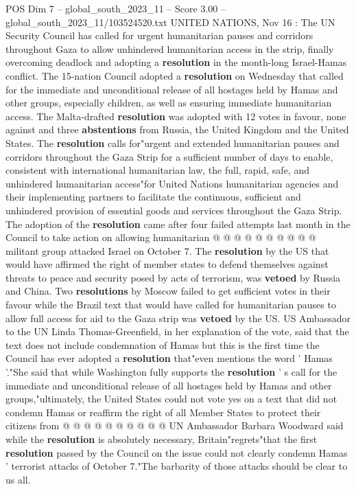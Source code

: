 \begin{textsample}{POS Dim 7 – global\_south\_2023\_11 – Score 3.00 – global\_south\_2023\_11/103524520.txt}  \label{ex:f7_pos_123}
UNITED NATIONS, Nov 16 : The UN Security Council has called for urgent humanitarian pauses and corridors throughout Gaza to allow unhindered humanitarian access in the strip, finally overcoming deadlock and adopting a \textbf{resolution} in the month-long Israel-Hamas conflict.
The 15-nation Council adopted a \textbf{resolution} on Wednesday that called for the immediate and unconditional release of all hostages held by Hamas and other groups, especially children, as well as ensuring immediate humanitarian access.
The Malta-drafted \textbf{resolution} was adopted with 12 votes in favour, none against and three \textbf{abstentions} from Russia, the United Kingdom and the United States.
The \textbf{resolution} calls for"urgent and extended humanitarian pauses and corridors throughout the Gaza Strip for a sufficient number of days to enable, consistent with international humanitarian law, the full, rapid, safe, and unhindered humanitarian access"for United Nations humanitarian agencies and their implementing partners to facilitate the continuous, sufficient and unhindered provision of essential goods and services throughout the Gaza Strip.
The adoption of the \textbf{resolution} came after four failed attempts last month in the Council to take action on allowing humanitarian @ @ @ @ @ @ @ @ @ @ militant group attacked Israel on October 7.
The \textbf{resolution} by the US that would have affirmed the right of member states to defend themselves against threats to peace and security posed by acts of terrorism, was \textbf{vetoed} by Russia and China.
Two \textbf{resolutions} by Moscow failed to get sufficient votes in their favour while the Brazil text that would have called for humanitarian pauses to allow full access for aid to the Gaza strip was \textbf{vetoed} by the US.
US Ambassador to the UN Linda Thomas-Greenfield, in her explanation of the vote, said that the text does not include condemnation of Hamas but this is the first time the Council has ever adopted a \textbf{resolution} that"even mentions the word ' Hamas '."She said that while Washington fully supports the \textbf{resolution} ' s call for the immediate and unconditional release of all hostages held by Hamas and other groups,"ultimately, the United States could not vote yes on a text that did not condemn Hamas or reaffirm the right of all Member States to protect their citizens from @ @ @ @ @ @ @ @ @ @ UN Ambassador Barbara Woodward said while the \textbf{resolution} is absolutely necessary, Britain"regrets"that the first \textbf{resolution} passed by the Council on the issue could not clearly condemn Hamas ' terrorist attacks of October 7."The barbarity of those attacks should be clear to us all.

\end{textsample}
